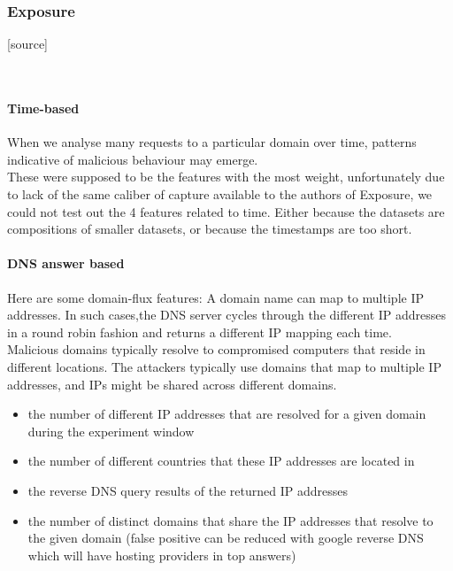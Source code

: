 \subsubsection{Exposure}
[source]

\\

\paragraph{Time-based}
When we analyse many requests to a particular domain over
time, patterns indicative of malicious behaviour may emerge.\\
These were supposed to be the features with the most weight, unfortunately due to lack of the same caliber of capture available to the authors of Exposure, we could not test out the 4 features related to time. Either because the datasets are compositions of smaller datasets, or because the timestamps are too short.
\paragraph{DNS answer based}
Here are some domain-flux features: A domain name can map to multiple IP addresses. In such cases,the DNS server cycles through the different IP addresses in a round robin fashion and returns a different IP mapping each time. \\
Malicious domains typically resolve to compromised computers that reside in different locations. The attackers typically use domains that map to multiple IP addresses, and IPs might be shared across different domains.
\begin{itemize}
\item the number of different IP addresses that are resolved for a given domain during the experiment window
\item the number of different countries that these IP addresses are located in
\item the reverse DNS query results of the returned IP addresses
\item the number of distinct domains that share the IP addresses that resolve to the given domain (false positive can be reduced with google reverse DNS which will have hosting providers in top answers)
\end{itemize}
